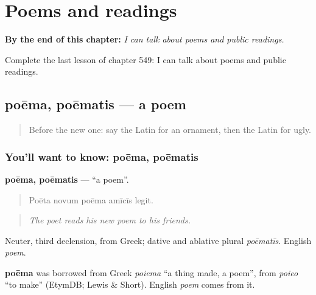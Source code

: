
\chapter{Poems and readings}
\label{ch:la-poems-and-readings}

\begin{chapteropening}
\textbf{By the end of this chapter:} \emph{I can talk about poems and public readings.}

Complete the last lesson of chapter 549: I can talk about poems and public readings.
\end{chapteropening}

\section[poēma, poēmatis]{poēma, poēmatis — a poem}

\label{lesson:LA-C549-poema}



\begin{quote}
Before the new one: say the Latin for an ornament, then the Latin for ugly.
\end{quote}

\subsection*{You'll want to know: poēma, poēmatis}
\textbf{poēma, poēmatis} — \textquotedblleft{}a poem\textquotedblright{}.

\begin{quote}
Poēta novum poēma amīcīs legit.
\end{quote}

\begin{quote}
\emph{The poet reads his new poem to his friends.}
\end{quote}

Neuter, third declension, from Greek; dative and ablative plural \emph{poēmatīs}. English \emph{poem}.

\begin{cousinweb}
\textbf{poēma} was borrowed from Greek \emph{poiema} \textquotedblleft{}a thing made, a poem\textquotedblright{}, from \emph{poieo} \textquotedblleft{}to make\textquotedblright{} (EtymDB; Lewis \& Short). English \emph{poem} comes from it.
\end{cousinweb}

